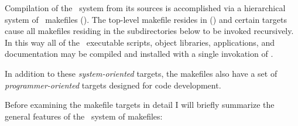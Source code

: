 Compilation of the \aipspp\ system from its sources is accomplished via a
hierarchical system of \gnu\ makefiles ().  The top-level makefile
resides in  () and certain targets cause all
makefiles residing in the subdirectories below to be invoked recursively.  In
this way all of the \aipspp\ executable scripts, object libraries,
applications, and documentation may be compiled and installed with a single
invokation of .

In addition to these {\em system-oriented} targets, the makefiles also have a
set of {\em programmer-oriented} targets designed for code development.

Before examining the makefile targets in detail I will briefly summarize the
general features of the \aipspp\ system of makefiles:

